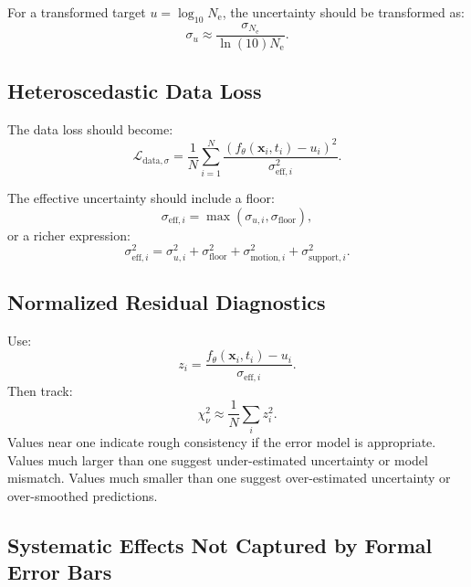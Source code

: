 \documentclass[11pt]{article}
\newcommand{\Ne}{N_{\mathrm e}}
\begin{document}
For a transformed target $u=\log_{10}\Ne$, the uncertainty should be transformed as:
\begin{equation}
  \sigma_u
  \approx
  \frac{\sigma_{\Ne}}{\ln(10)\Ne}.
\end{equation}

\subsection{Heteroscedastic Data Loss}

The data loss should become:
\begin{equation}
  \mathcal{L}_{\mathrm{data},\sigma}
  =
  \frac{1}{N}
  \sum_{i=1}^{N}
  \frac{
    \left(f_{\theta}(\mathbf{x}_i,t_i)-u_i\right)^2
  }{
    \sigma_{\mathrm{eff},i}^2
  }.
\end{equation}

The effective uncertainty should include a floor:
\begin{equation}
  \sigma_{\mathrm{eff},i}
  =
  \max(\sigma_{u,i},\sigma_{\mathrm{floor}}),
\end{equation}
or a richer expression:
\begin{equation}
  \sigma_{\mathrm{eff},i}^2
  =
  \sigma_{u,i}^2
  +
  \sigma_{\mathrm{floor}}^2
  +
  \sigma_{\mathrm{motion},i}^2
  +
  \sigma_{\mathrm{support},i}^2.
\end{equation}

\subsection{Normalized Residual Diagnostics}

Use:
\begin{equation}
  z_i =
  \frac{
    f_{\theta}(\mathbf{x}_i,t_i)-u_i
  }{
    \sigma_{\mathrm{eff},i}
  }.
\end{equation}
Then track:
\begin{equation}
  \chi^2_{\nu}
  \approx
  \frac{1}{N}
  \sum_i z_i^2.
\end{equation}
Values near one indicate rough consistency if the error model is appropriate. Values much larger
than one suggest under-estimated uncertainty or model mismatch. Values much smaller than one
suggest over-estimated uncertainty or over-smoothed predictions.

\subsection{Systematic Effects Not Captured by Formal Error Bars}
\end{document}
